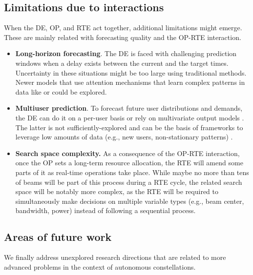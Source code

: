 \documentclass[letterpaper]{article} %
\begin{document}
\subsection{Limitations due to interactions}
When the DE, OP, and RTE act together, additional limitations might emerge. These are mainly related with forecasting quality and the OP-RTE interaction.
\begin{itemize}
    \item \textbf{Long-horizon forecasting}. The DE is faced with challenging prediction windows when a delay exists between the current and the target times. Uncertainty in these situations might be too large using traditional methods. Newer models that use attention mechanisms that learn complex patterns in data like \cite{Li2019} or \cite{Wu2020DeepCase} could be explored.

    \item \textbf{Multiuser prediction}. To forecast future user distributions and demands, the DE can do it on a per-user basis or rely on multivariate output models \cite{CharkrabortyKishanMehrotra1990ForecastingNetworks, Wan2019MultivariateForecasting}. The latter is not sufficiently-explored and can be the basis of frameworks to leverage low amounts of data (e.g., new users, non-stationary patterns) \cite{Yu2016TemporalPrediction}.

    \item \textbf{Search space complexity.} As a consequence of the OP-RTE interaction, once the OP sets a long-term resource allocation, the RTE will amend some parts of it as real-time operations take place. While maybe no more than tens of beams will be part of this process during a RTE cycle, the related search space will be notably more complex, as the RTE will be required to simultaneously make decisions on multiple variable types (e.g., beam center, bandwidth, power) instead of following a sequential process.

\end{itemize}


\subsection{Areas of future work}
We finally address unexplored research directions that are related to more advanced problems in the context of autonomous constellations.
\end{document}
